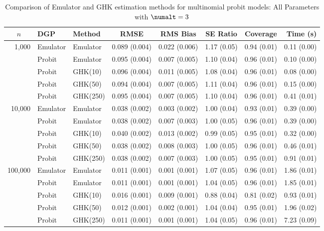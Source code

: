 \begin{table}[htbp]
\centering
\footnotesize
\begin{tabular}{@{}rllrrrrr@{}}
\toprule
\multicolumn{1}{c}{$n$} & \multicolumn{1}{l}{DGP} & \multicolumn{1}{l}{Method} & \multicolumn{1}{c}{RMSE} & \multicolumn{1}{c}{RMS Bias} & \multicolumn{1}{c}{SE Ratio} & \multicolumn{1}{c}{Coverage} & \multicolumn{1}{r}{Time (s)} \\
\midrule
\multirow{5}{*}{1,000} & Emulator & Emulator & 0.089 (0.004) & 0.022 (0.006) & 1.17 (0.05) & 0.94 (0.01) & 0.11 (0.00) \\
 & Probit & Emulator & 0.095 (0.004) & 0.007 (0.005) & 1.10 (0.04) & 0.96 (0.01) & 0.10 (0.00) \\
 & Probit & GHK(10) & 0.096 (0.004) & 0.011 (0.005) & 1.08 (0.04) & 0.96 (0.01) & 0.08 (0.00) \\
 & Probit & GHK(50) & 0.094 (0.004) & 0.007 (0.005) & 1.11 (0.04) & 0.96 (0.01) & 0.15 (0.00) \\
 & Probit & GHK(250) & 0.095 (0.004) & 0.007 (0.005) & 1.10 (0.04) & 0.96 (0.01) & 0.41 (0.01) \\
\midrule
\multirow{5}{*}{10,000} & Emulator & Emulator & 0.038 (0.002) & 0.003 (0.002) & 1.00 (0.04) & 0.93 (0.01) & 0.39 (0.00) \\
 & Probit & Emulator & 0.038 (0.002) & 0.007 (0.003) & 1.00 (0.05) & 0.96 (0.01) & 0.39 (0.00) \\
 & Probit & GHK(10) & 0.040 (0.002) & 0.013 (0.002) & 0.99 (0.05) & 0.95 (0.01) & 0.32 (0.00) \\
 & Probit & GHK(50) & 0.038 (0.002) & 0.008 (0.003) & 1.00 (0.05) & 0.96 (0.01) & 0.46 (0.01) \\
 & Probit & GHK(250) & 0.038 (0.002) & 0.007 (0.003) & 1.00 (0.05) & 0.95 (0.01) & 0.91 (0.01) \\
\midrule
\multirow{5}{*}{100,000} & Emulator & Emulator & 0.011 (0.001) & 0.001 (0.001) & 1.07 (0.05) & 0.96 (0.01) & 1.86 (0.01) \\
 & Probit & Emulator & 0.011 (0.001) & 0.001 (0.001) & 1.04 (0.05) & 0.96 (0.01) & 1.85 (0.01) \\
 & Probit & GHK(10) & 0.016 (0.001) & 0.009 (0.001) & 0.88 (0.04) & 0.81 (0.02) & 0.93 (0.01) \\
 & Probit & GHK(50) & 0.012 (0.001) & 0.002 (0.001) & 1.04 (0.04) & 0.95 (0.01) & 1.96 (0.02) \\
 & Probit & GHK(250) & 0.011 (0.001) & 0.001 (0.001) & 1.04 (0.05) & 0.96 (0.01) & 7.23 (0.09) \\
\bottomrule
\end{tabular}
\caption{Comparison of Emulator and GHK estimation methods for multinomial probit models: All Parameters with $\numalt=3$}
\label{tab:emulator_vs_ghk:3:all}
\end{table}